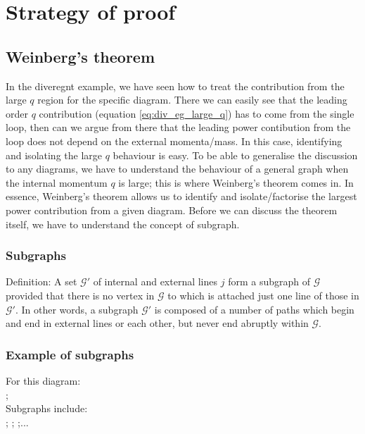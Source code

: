 \documentclass{article}
\begin{document}
\section{Strategy of proof}
\subsection{Weinberg's theorem}
In the diveregnt example, we have seen how to treat the contribution from the large $q$ region for the specific diagram. There we can easily see that the leading order $q$ contribution (equation \ref{eq:div_eg_large_q}) has to come from the single loop, then can we argue from there that the leading power contibution from the loop does not depend on the external momenta/mass. In this case, identifying and isolating the large $q$ behaviour is easy. To be able to generalise the discussion to any diagrams, we have to understand the behaviour of a general graph when the internal momentum $q$ is large; this is where Weinberg's theorem \cite{weinberg} comes in. In essence, Weinberg's theorem allows us to identify and isolate/factorise the largest power contribution from a given diagram. Before we can discuss the theorem itself, we have to understand the concept of subgraph.\\



\subsubsection{Subgraphs}
Definition: A set $\mathcal{G'}$ of internal and external lines $j$ form a subgraph of $\mathcal{G}$ provided that there is no vertex in $\mathcal{G}$ to which is attached just one line of those in $\mathcal{G'}$. In other words, a subgraph $\mathcal{G'}$ is composed of a number of paths which begin and end in external lines or each other, but never end abruptly within $\mathcal{G}$. 

\subsubsection{Example of subgraphs}
For this diagram:\\
;\\
Subgraphs include:\\
;
;
;...\\
\end{document}
